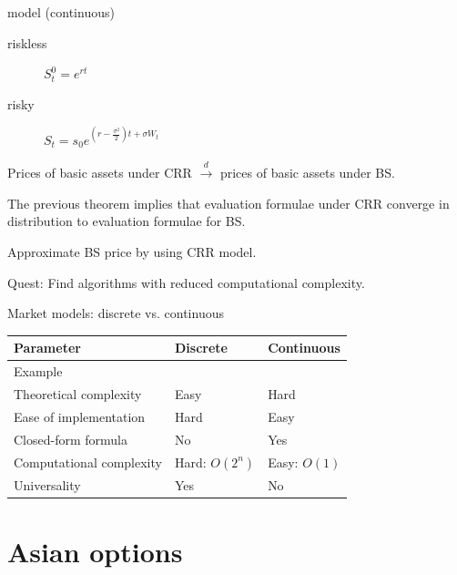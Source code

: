 \documentclass[utf8,t,xcolor=svgnames]{beamer}
\begin{document}
\begin{frame}{\cite{Black1973} model (continuous)}
	\begin{description}
		\item[riskless] $ S_t^0 = e^{rt} $
		\item[risky] $ S_t  =  s_0 e^{ ( r - \frac{\sigma^2}{2} ) t + \sigma W_t } $
	\end{description}
	
	\begin{theorem}
		Prices of basic assets under CRR $ \xrightarrow{d} $ prices of basic assets under BS.
	\end{theorem}
	
	\begin{corollary}
		The previous theorem implies that evaluation formulae under CRR converge in distribution to evaluation formulae for BS.
	\end{corollary}
	
	\bigskip
	
	Approximate BS price by using CRR model.
	
	\bigskip
	
	\alert{Quest}: Find algorithms with reduced computational complexity.
	
\end{frame}


\begin{frame}{Market models: discrete vs. continuous}
	\begin{tabular}{lll}
		\toprule
		Parameter  &  Discrete  &  Continuous  \\
		\midrule
		Example  &  \cite{Cox1979}  &  \cite{Black1973}  \\
		Theoretical complexity  &  Easy  &  Hard  \\
		Ease of implementation  &  Hard  &  Easy  \\
		Closed-form formula  &  No\footnotemark  &  Yes  \\
		Computational complexity  &  Hard: $ O(2^n) $\footnotemark[1]  &  Easy: $ O(1) $  \\
		Universality  &  Yes  &  No  \\
		\bottomrule
	\end{tabular}
\end{frame}



\section{Asian options}
\end{document}

